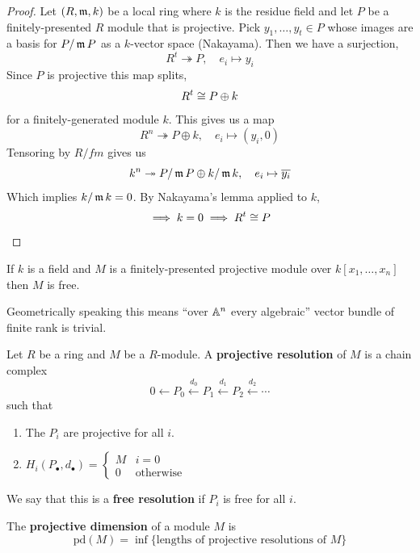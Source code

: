\documentclass[12pt]{amsart}
\begin{document}
\begin{proof}
    Let $(R, \operatorname{\mathfrak{m}}, k)$ be a local ring where $k$ is the residue field and let $P$ be a finitely-presented $R$ module that is projective. Pick $y_1, \ldots, y_t \in P$ whose images are a basis for $P/\operatorname{\mathfrak{m}} P$ as a $k$-vector space (Nakayama). Then we have a surjection, 
    \[R^t \twoheadrightarrow P, \quad e_i \mapsto y_i\]
    Since $P$ is projective this map splits, 
    \[R^t \cong P \oplus k\]
    for a finitely-generated module $k$. 
    This gives us a map 
    \[R^n \twoheadrightarrow P \oplus k, \quad e_i \mapsto (y_i, 0)\]
    Tensoring by $R/fm$ gives us 
    \[k^n \twoheadrightarrow P/\operatorname{\mathfrak{m}} P \oplus k/\operatorname{\mathfrak{m}} k, \quad e_i \mapsto \overline{y_i}\]
    Which implies $k/\operatorname{\mathfrak{m}} k = 0$. By Nakayama's lemma applied to $k$, 
    \[\implies k = 0 \implies R^t \cong P\]
\end{proof}

\begin{theorem}
    If $k$ is a field and $M$ is a finitely-presented projective module over $k[x_1, \ldots, x_n]$ then $M$ is free. 

    Geometrically speaking this means 
    ``over $\mathbb A^n$ every algebraic'' vector bundle of finite rank is trivial. 
\end{theorem}

\begin{definition}
    Let $R$ be a ring and $M$ be a $R$-module. A \textbf{projective resolution} of $M$ is a chain complex 
    \[0 \leftarrow P_0 \xleftarrow{d_0} P_1 \xleftarrow{d_1} P_2 \xleftarrow{d_2} \cdots\]
    such that 
    \begin{enumerate}
        \item The $P_i$ are projective for all $i$. 
        \item $H_i(P_{\bullet}, d_{\bullet}) = \begin{cases}
            M & i = 0 \\ 
            0 & \text{otherwise}
        \end{cases}$
    \end{enumerate}
    We say that this is a \textbf{free resolution} if $P_i$ is free for all $i$. 
\end{definition}

\begin{definition}
    The \textbf{projective dimension} of a module $M$ is 
    \[\text{pd}(M) = \inf \{\text{lengths of projective resolutions of } M\}\]
\end{definition}
\end{document}
